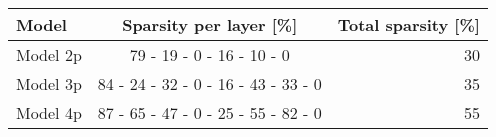 \begin{tabular}{lcr}
\toprule
 Model    &       Sparsity per layer [\%]        &   Total sparsity [\%] \\
\midrule
 Model 2p &      79 - 19 - 0 - 16 - 10 - 0      &                   30 \\
 Model 3p & 84 - 24 - 32 - 0 - 16 - 43 - 33 - 0 &                   35 \\
 Model 4p & 87 - 65 - 47 - 0 - 25 - 55 - 82 - 0 &                   55 \\
\bottomrule
\end{tabular}